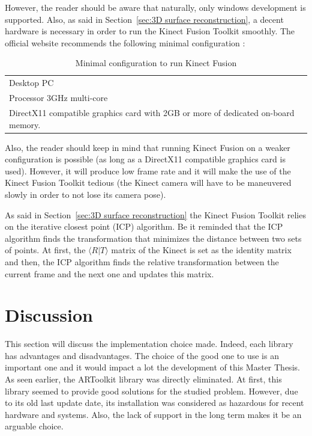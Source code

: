 However, the reader should be aware that naturally, only windows development is supported. Also, as said in Section~\ref{sec:3D surface reconstruction}, a decent hardware is necessary in order to run the Kinect Fusion Toolkit smoothly. The official website recommends the following minimal configuration \cite{kinect}:


\begin{table}[h]
\caption{Minimal configuration to run Kinect Fusion}
\begin{tabular}{l}
 Desktop PC \\
 Processor 3GHz multi-core\\
 DirectX11 compatible graphics card with 2GB or more of dedicated on-board memory.
\end{tabular}
\label{tab:kinectfusion-minimalconfiguration}
\end{table}

Also, the reader should keep in mind that running Kinect Fusion on a weaker configuration is possible (as long as a DirectX11 compatible graphics card is used). However, it will produce low frame rate and it will make the use of the Kinect Fusion Toolkit tedious (the Kinect camera will have to be maneuvered slowly in order to not lose its camera pose).

As said in Section~\ref{sec:3D surface reconstruction} the Kinect Fusion Toolkit relies on the iterative closest point (ICP) algorithm. Be it reminded that the ICP algorithm finds the transformation that minimizes the distance between two sets of points. At first, the $\langle R\vert T\rangle$ matrix of the Kinect is set as the identity matrix and then, the ICP algorithm finds the relative transformation between the current frame and the next one and updates this matrix.\\

\section{Discussion}
This section will discuss the implementation choice made. Indeed, each library has advantages and disadvantages. The choice of the good one to use is an important one and it would impact a lot the development of this Master Thesis.\\ 

As seen earlier, the ARToolkit library was directly eliminated. At first, this library seemed to provide good solutions for the studied problem. However, due to its old last update date, its installation was considered as hazardous for recent hardware and systems. Also, the lack of support in the long term makes it be an arguable choice.\\

